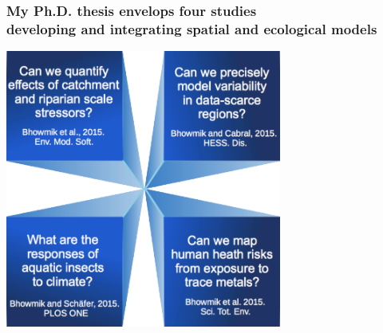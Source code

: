 \documentclass[10pt, compress]{beamer}
\begin{document}
\begin{frame}
  \frametitle{My Ph.D. thesis envelops four studies \protect\\ developing and integrating spatial and ecological models}
  \centering
  \includegraphics[width=0.68\textwidth]{images/Studies.png}
\end{frame}


\end{document}
